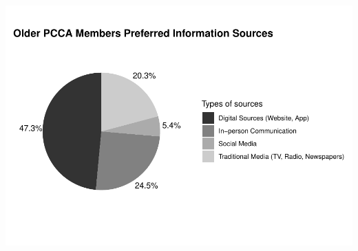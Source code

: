 \documentclass[
]{article}
\begin{document}
\includegraphics{pcca_survey_files/figure-latex/information-old-1.pdf}
\end{document}
